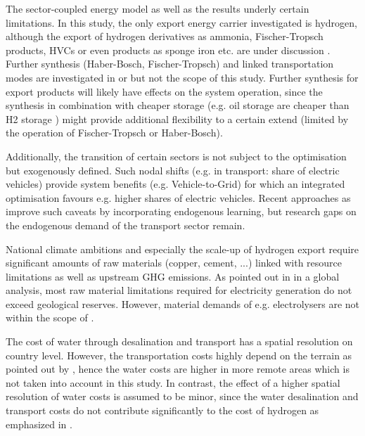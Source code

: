 The sector-coupled energy model as well as the results underly certain limitations. In this study, the only export energy carrier investigated is hydrogen, although the export of hydrogen derivatives as ammonia, Fischer-Tropsch products, HVCs or even products as sponge iron etc. are under discussion \cite{Verpoort2023}. Further synthesis (Haber-Bosch, Fischer-Tropsch) and linked transportation modes are investigated in \cite{Hampp2021} or \cite{Galimova2023} but not the scope of this study. Further synthesis for export products will likely have effects on the system operation, since the synthesis in combination with cheaper storage (e.g. oil storage are cheaper than H2 storage \cite{DEA2019TechnologyData}) might provide additional flexibility to a certain extend (limited by the operation of Fischer-Tropsch or Haber-Bosch).

Additionally, the transition of certain sectors is not subject to the optimisation but exogenously defined. Such nodal shifts (e.g. in transport: share of electric vehicles) provide system benefits (e.g. Vehicle-to-Grid) for which an integrated optimisation favours e.g. higher shares of electric vehicles.
Recent approaches as \cite{Zeyen2023} improve such caveats by incorporating endogenous learning, but research gaps on the endogenous demand of the transport sector remain.

National climate ambitions and especially the scale-up of hydrogen export require significant amounts of raw materials (copper, cement, ...) linked with resource limitations as well as upstream GHG emissions. As pointed out in \cite{Wang2023} in a global analysis, most raw material limitations required for electricity generation do not exceed geological reserves. However, material demands of e.g. electrolysers are not within the scope of \cite{Wang2023}.

The cost of water through desalination and transport has a spatial resolution on country level. However, the transportation costs highly depend on the terrain as pointed out by \cite{Caldera2016}, hence the water costs are higher in more remote areas which is not taken into account in this study. In contrast, the effect of a higher spatial resolution of water costs is assumed to be minor, since the water desalination and transport costs do not contribute significantly to the cost of hydrogen as emphasized in \cite{Hampp2023}. %


